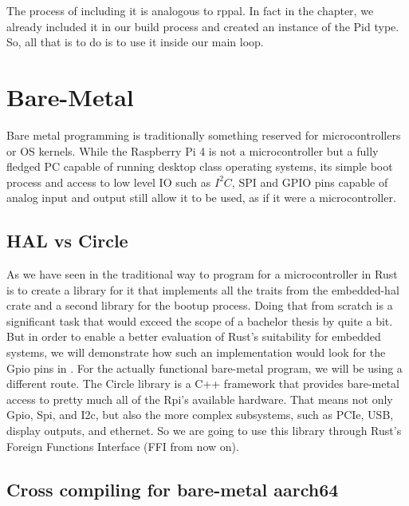 The process of including it is analogous to rppal.
In fact in the  chapter,
we already included it in our build process and created an instance of the Pid type.
So, all that is to do is to use it inside our main loop.



\section{Bare-Metal}
\label{sec:concept_and_implementation:bare_metal}

Bare metal programming is traditionally something reserved for microcontrollers or OS kernels.
While the Raspberry Pi 4 is not a microcontroller but a fully fledged PC capable of running desktop class operating systems,
its simple boot process and access to low level IO such as $I^2C$, SPI and GPIO pins capable of analog input and output still allow it to be used, as if it were a microcontroller.

\subsection{HAL vs Circle}
\label{sec:concept_and_implementation:bare-metal:hal}

As we have seen in  the traditional way to program for a microcontroller in Rust
is to create a library for it that implements all the traits from the embedded-hal crate and a second library for the bootup process.
Doing that from scratch is a significant task that would exceed the scope of a bachelor thesis by quite a bit.
But in order to enable a better evaluation of Rust's suitability for embedded systems, we will demonstrate how such an implementation would look for the Gpio pins in .
For the actually functional bare-metal program, we will be using a different route.
The Circle library is a C++ framework that provides bare-metal access to pretty much all of the Rpi's available hardware.
That means not only Gpio, Spi, and I2c, but also the more complex subsystems, such as PCIe, USB, display outputs, and ethernet.
So we are going to use this library through Rust's Foreign Functions Interface (FFI from now on).

\subsection{Cross compiling for bare-metal aarch64}
\label{sec:concept_and_implementation:bare-metal:cross}

